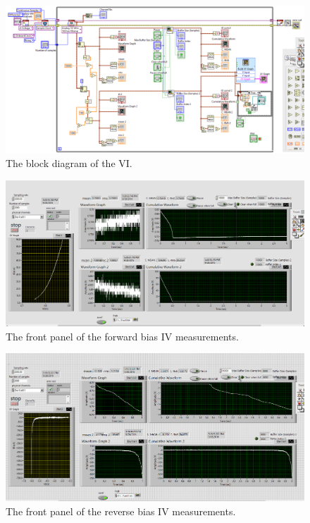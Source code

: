 \documentclass[11pt]{article}
\begin{document}
\begin{figure}[H]
 \begin{center}
  \includegraphics[width=\linewidth/1]{act3bp}
  \caption{The block diagram of the VI.}
  \label{fig:act3bp}
 \end{center}
\end{figure}

\begin{figure}[H]
 \begin{center}
  \includegraphics[width=\linewidth/1]{act3bias2}
  \caption{The front panel of the forward bias IV measurements.}
  \label{fig:act3bias2}
 \end{center}
\end{figure}

\begin{figure}[H]
 \begin{center}
  \includegraphics[width=\linewidth/1]{act3rev1}
  \caption{The front panel of the reverse bias IV measurements.}
  \label{fig:act3rev1}
 \end{center}
\end{figure}
\end{document}
